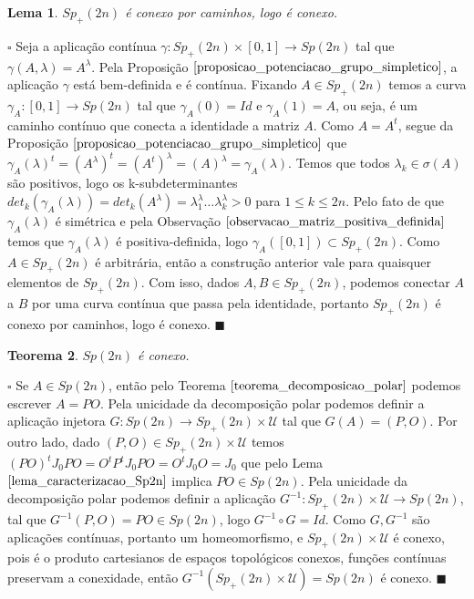 \documentclass[12pt]{book}
\newtheorem{teorema}{Teorema}[section]
\newtheorem{lema}[teorema]{Lema}
\newenvironment{prova}[1]{$\square$ #1}{\hfill$\blacksquare$}
\newcommand{\estruturacomplexa}{J_{0}}
\newcommand{\gruposimpletico}[1]{Sp(#1)}
\newcommand{\gruposimpleticopositivo}[1]{Sp_{+}(#1)}
\begin{document}
	\begin{lema}
		$\gruposimpleticopositivo{2n}$ é conexo por caminhos, logo é conexo.
	\end{lema}
	\begin{prova}
		Seja a aplicação contínua $\gamma:\gruposimpleticopositivo{2n}\times [0,1] \to \gruposimpletico{2n}$ tal que $\gamma(A,\lambda) = A^{\lambda}$. Pela Proposição $\ref{proposicao_potenciacao_grupo_simpletico}$, a aplicação $\gamma$ está bem-definida e é contínua. Fixando $A \in \gruposimpleticopositivo{2n}$ temos a curva $\gamma_{A}:[0,1]\to \gruposimpletico{2n}$ tal que $\gamma_{A}(0) = Id$ e $\gamma_{A}(1) = A$, ou seja, é um caminho contínuo que conecta a identidade a matriz $A$. Como $A=A^{t}$, segue da Proposição $\ref{proposicao_potenciacao_grupo_simpletico}$ que $\gamma_{A}(\lambda)^{t} = (A^{\lambda})^{t} = (A^{t})^{\lambda} = (A)^{\lambda} = \gamma_{A}(\lambda)$. Temos que todos $\lambda_{k} \in \sigma(A)$ são positivos, logo os k-subdeterminantes $det_{k}(\gamma_{A}(\lambda)) = det_{k}(A^{\lambda}) = \lambda_{1}^{\lambda}\dots\lambda_{k}^{\lambda}>0$ para $1\leq k \leq 2n$. Pelo fato de que $\gamma_{A}(\lambda)$ é simétrica e pela Observação $\ref{observacao_matriz_positiva_definida}$ temos que $\gamma_{A}(\lambda)$ é positiva-definida, logo $\gamma_{A}([0,1]) \subset \gruposimpleticopositivo{2n}$. Como $A \in \gruposimpleticopositivo{2n}$ é arbitrária, então a construção anterior vale para quaisquer elementos de $\gruposimpleticopositivo{2n}$. Com isso, dados $A, B \in \gruposimpleticopositivo{2n}$, podemos conectar $A$ a $B$ por uma curva contínua que passa pela identidade, portanto $\gruposimpleticopositivo{2n}$ é conexo por caminhos, logo é conexo.
	\end{prova}	
	
	\begin{teorema}\label{teoerma_sp2n_conexo}
		$\gruposimpletico{2n}$ é conexo.
	\end{teorema}
	\begin{prova}
		Se $A \in \gruposimpletico{2n}$, então pelo Teorema $\ref{teorema_decomposicao_polar}$ podemos escrever $A=PO$. Pela unicidade da decomposição polar podemos definir a aplicação injetora $G: \gruposimpletico{2n} \to \gruposimpleticopositivo{2n} \times \mathcal{U}$ tal que $G(A) = (P,O)$. Por outro lado, dado $(P,O) \in \gruposimpleticopositivo{2n} \times \mathcal{U}$ temos $(PO)^{t}\estruturacomplexa PO = O^{t}P^{t}\estruturacomplexa PO = O^{t}\estruturacomplexa O = \estruturacomplexa$ que pelo Lema $\ref{lema_caracterizacao_Sp2n}$ implica $PO \in \gruposimpletico{2n}$. Pela unicidade da decomposição polar podemos definir a aplicação $G^{-1}:\gruposimpleticopositivo{2n}\times \mathcal{U} \to \gruposimpletico{2n}$, tal que $G^{-1}(P,O) = PO \in \gruposimpletico{2n}$, logo $G^{-1} \circ G =Id$. Como $G, G^{-1}$ são aplicações contínuas, portanto um homeomorfismo, e $\gruposimpleticopositivo{2n}\times \mathcal{U}$ é conexo, pois é o produto cartesianos de espaços topológicos conexos, funções contínuas preservam a conexidade, então $G^{-1}(\gruposimpleticopositivo{2n}\times \mathcal{U}) = \gruposimpletico{2n}$ é conexo.
	\end{prova}
	
\end{document}
